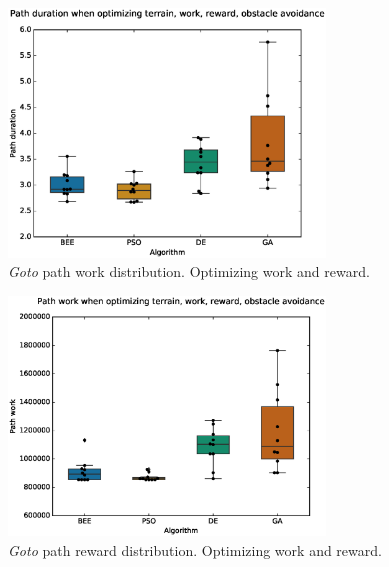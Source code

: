 \documentclass{tamuccthesis}
\begin{document}
\begin{figure}
    \captionsetup{justification=centering}
    \centering
    \includegraphics[width=0.75\textwidth,trim={0cm 0.75cm 0cm 0.75cm},clip]{EXP3_histo_duration_b.eps}
    \caption{\textit{Goto} path work distribution. Optimizing work and reward. }
    \label{fig:algcompare_b_duration}
\end{figure}

\begin{figure}
    \captionsetup{justification=centering}
    \centering
    \includegraphics[width=0.75\textwidth,trim={0cm 0.75cm 0cm 0.75cm},clip]{EXP3_histo_work_b.eps}
    \caption{\textit{Goto} path reward distribution. Optimizing work and reward. }
    \label{fig:algcompare_b_work}
\end{figure}
\end{document}
